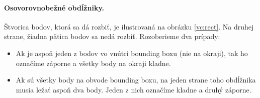 \paragraph{Osovorovnobežné obdĺžniky.} Štvorica bodov, ktorá sa dá
rozbiť, je ilustrovaná na obrázku \ref{vc:rect}. Na druhej strane,
žiadna pätica bodov sa nedá rozbiť. Rozoberieme dva prípady:
\begin{itemize}
  \item Ak je aspoň jeden z bodov vo vnútri bounding boxu (nie na okraji),
    tak ho označíme záporne a všetky body na okraji kladne.
  \item Ak sú všetky body na obvode bounding boxu, na jeden strane
    toho obdĺžnika musia ležať aspoň dva body. Jeden z nich označíme
    kladne a druhý záporne.
\end{itemize}


